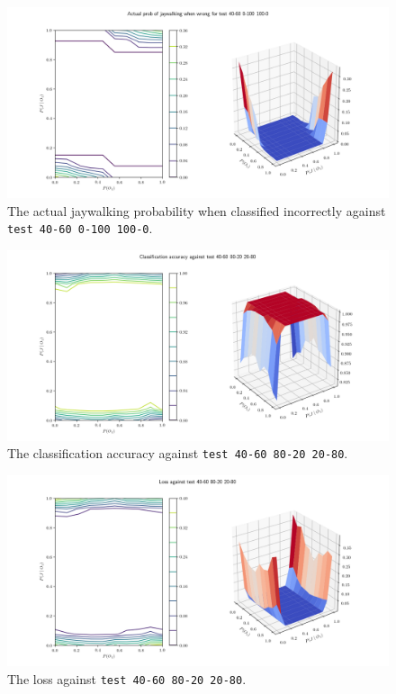 \documentclass[paper=a4paper]{report}
\newcommand{\code}{\texttt}
\begin{document}
\begin{figure}[h]
    \centering
    \centerline{\includegraphics[scale=0.55]{test_40-60_0-100_100-0_jay_prob.png}}
    \caption[]{The actual jaywalking probability when classified incorrectly against \code{test 40-60 0-100 100-0}.}
    \label{fig:test_40-60_0-100_100-0_jay_prob_plot}
\end{figure}

% 
% 

\begin{figure}[h]
    \centering
    \centerline{\includegraphics[scale=0.55]{test_40-60_80-20_20-80_accuracy.png}}
    \caption[]{The classification accuracy against \code{test 40-60 80-20 20-80}.}
    \label{fig:test_40-60_80-20_20-80_accuracy_plot}
\end{figure}

\begin{figure}[h]
    \centering
    \centerline{\includegraphics[scale=0.55]{test_40-60_80-20_20-80_loss.png}}
    \caption[]{The loss against \code{test 40-60 80-20 20-80}.}
    \label{fig:test_40-60_80-20_20-80_loss_plot}
\end{figure}
\end{document}
